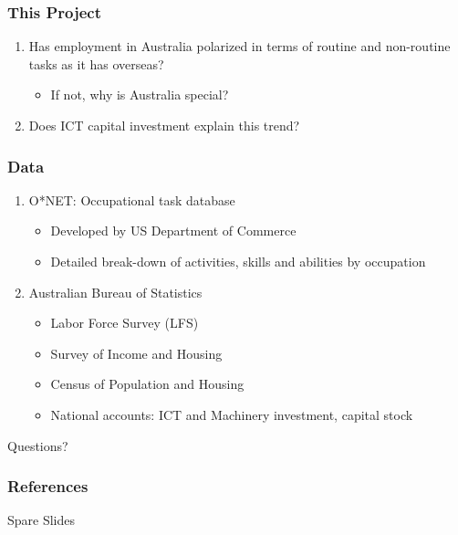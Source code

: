 \documentclass[red]{beamer}
\begin{document}
\begin{frame}
  \frametitle{This Project}
  \begin{enumerate}
  \item  Has employment in Australia polarized in terms of routine and non-routine tasks as it has overseas?
    \begin{itemize}
    \item If not, why is Australia special?
    \end{itemize}
  \item Does ICT capital investment explain this trend?
  \end{enumerate}
\end{frame}

\begin{frame}
  \frametitle{Data}
  \begin{enumerate}
  \item O*NET: Occupational task database
    \begin{itemize}
    \item Developed by US Department of Commerce
    \item Detailed break-down of activities, skills and abilities by occupation
    \end{itemize}
  \item Australian Bureau of Statistics
    \begin{itemize}
    \item Labor Force Survey (LFS)
    \item Survey of Income and Housing
    \item Census of Population and Housing
    \item National accounts: ICT and Machinery investment, capital stock
    \end{itemize}
  \end{enumerate}
\end{frame}

\begin{frame}
  \begin{center}
    Questions?    
  \end{center}
\end{frame}

\begin{frame}
\frametitle{References}
\printbibliography
\end{frame}

\begin{frame}
  \begin{center}
    Spare Slides
  \end{center}
\end{frame}
\end{document}
